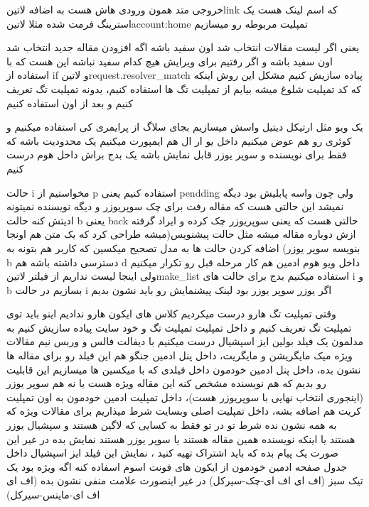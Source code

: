 \documentclass{article}
\begin{document}
	  		 خروجی متد همون ورودی هاش هست به اضافه ‌لاتین{link} که اسم لینک هست یک استرینگ فرمت شده مثلا ‌لاتین{account:home}
	  		 تمپلیت مربوطه رو میسازیم 
	  		



			یعنی اگر لیست مقالات انتخاب شد اون سفید باشه اگه افزودن مقاله جدید انتخاب شد اون سفید باشه و اگر رفتیم برای ویرایش هیچ کدام
			سفید نباشه
			 این هست که با استفاده از if و ‌لاتین{request.resolver\_match} پیاده سازیش کنیم مشکل این روش اینکه که
			کد تمپلیت شلوغ میشه 
			 بیایم از تمپلیت تگ ها استفاده کنیم، یدونه تمپلیت تگ تعریف کنیم و بعد از اون استفاده کنیم
			
			 یک ویو مثل ارتیکل دیتیل واسش میسازیم بجای سلاگ از پرایمری کی استفاده میکنیم و کوئری رو هم عوض میکنیم
			 داخل یو ار ال هم ایمپورت میکنیم
			 یک محدودیت باشه که فقط برای نویسنده و سوپر یوزر قابل نمایش باشه
			 یک بدج براش داخل هوم درست کنیم
			
	
		حالت i مخواستیم از p استفاده کنیم یعنی pendding ولی چون واسه پابلیش بود دیگه نمیشد این حالتی هست که مقاله رفت برای چک سوپریوزر
		و دیگه نویسنده نمیتونه ادیتش کنه حالت b یعنی back حالتی هست که یعنی سوپریوزر چک کرده و ایراد گرفته ازش دوباره مقاله میشه مثل حالت
		پیشنویس(میشه طراحی کرد که یک متن هم اونجا بنویسه سوپر یوزر)
			 اضافه کردن حالت ها به مدل
			 تصحیح میکسین که کاربر هم بتونه به b دسترسی داشته باشه هم d 
			 داخل ویو هوم ادمین هم کار مرحله قبل رو تکرار میکنیم ولی اینجا لیست نداریم از فیلتر ‌لاتین{make\_list} استفاده میکنیم
			 بدج برای حالت های i و b بسازیم 
			 در حالت i اگر یوزر سوپر یوزر بود لینک پیشنمایش رو باید نشون بدیم
		
		 وقتی تمپلیت تگ هارو درست میکردیم کلاس های ایکون هارو ندادیم اینو باید توی تمپلیت تگ تعریف کنیم و داخل تمپلیت
		تمپلیت تگ و خود سایت پیاده سازیش کنیم
			به مدلمون یک فیلد بولین ایز اسپشیال درست میکنیم با دیفالت فالس و وربس نیم مقالات ویژه میک مایگریشن و مایگریت، داخل پنل ادمین
			جنگو هم این فیلد رو برای مقاله ها نشون بده، داخل پنل ادمین خودمون داخل فیلدی که با میکسین ها میسازیم این قابلیت رو بدیم 
			که هم نویسنده مشخص کنه این مقاله ویژه هست یا نه هم سوپر یوزر (اینجوری انتخاب نهایی با سوپریوزر هست)، داخل تمپلیت ادمین
			خودمون به اون تمپلیت کریت هم اضافه بشه، داخل تمپلیت اصلی وبسایت شرط میذاریم برای مقالات ویژه که به همه نشون نده
			شرط تو در تو فقط به کسایی که لاگین هستند و سپشیال یوزر هستند یا اینکه نویسنده همین مقاله هستند یا سوپر یوزر هستند نمایش بده 
			در غیر این صورت یک پیام بده که باید اشتراک تهیه کنید ، نمایش این فیلد ایز اسپشیال داخل جدول صفحه ادمین خودمون از ایکون های 
			فونت اسوم اسفاده کنه اگه ویژه بود یک تیک سبز (اف ای اف ای-چک-سیرکل) در غیر اینصورت علامت منفی نشون بده 
			(اف ای اف ای-ماینس-سیرکل)
			
\end{document}
